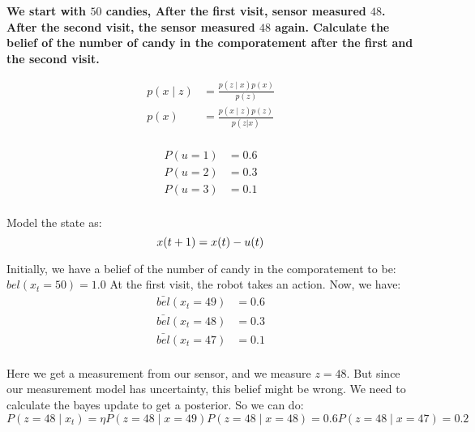 \documentclass[14pt,letterpaper]{article}
\theoremstyle{definition}
\begin{document}
\textbf{We start with $50$ candies, After the first visit, sensor measured $48$.
After the second visit, the sensor measured $48$ again. Calculate the belief of the number of candy in the comporatement after the first and the second visit.
}

\begin{align}
  p(x \mid z) &= \frac{p(z \mid x)p(x)}{p(z)} \\
  p(x) &= \frac{p(x \mid z)p(z)}{p(z | x)} \\
  \label{eq:Bayes Rule}
\end{align}

\begin{align}
  P(u = 1) &= 0.6 \\
  P(u = 2) &= 0.3 \\
  P(u = 3) &= 0.1 \\
  \label{eq: Action Probability Distributions}
\end{align}

Model the state as:
\begin{equation}
  x(t+1) = x(t) - u(t) \\
  \label{eq:State Model}
\end{equation}

Initially, we have a belief of the number of candy in the comporatement to be: $bel(x_t=50) = 1.0$
At the first visit, the robot takes an action. Now, we have:
\begin{align*}
  \bar{bel}(x_t=49) &= 0.6 \\
  \bar{bel}(x_t=48) &= 0.3 \\
  \bar{bel}(x_t=47) &= 0.1 \\
\end{align*}

Here we get a measurement from our sensor, and we measure $z = 48$. But since our measurement model has uncertainty, this belief might be wrong.
We need to calculate the bayes update to get a posterior. So we can do:
\begin{equation}
  P(z=48 \mid x_t) = \eta P(z=48 \mid x=49)
  P(z=48 \mid x=48) = 0.6
  P(z=48 \mid x=47) = 0.2
  \label{eq:}
\end{equation}
\end{document}
